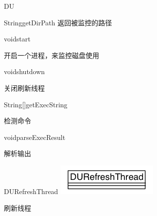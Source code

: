 \begin{XeClass}{DU}
\begin{XeMethod}{\XePublic}{String}{getDirPath}
 返回被监控的路径

    \end{XeMethod}

    \begin{XeMethod}{\XePublic}{void}{start}
         
 开启一个进程，来监控磁盘使用

    \end{XeMethod}

    \begin{XeMethod}{\XePublic}{void}{shutdown}
         
 关闭刷新线程

    \end{XeMethod}

    \begin{XeMethod}{\XeProtected}{String[]}{getExecString}
         
 检测命令

    \end{XeMethod}

    \begin{XeMethod}{\XeProtected}{void}{parseExecResult}
         
 解析输出

    \end{XeMethod}

    \begin{XeInnerClass}{DURefreshThread}
\includegraphics[width=\textwidth]{cdig/DURefreshThread.png}
         
 刷新线程

    \end{XeInnerClass}
\end{XeClass}

